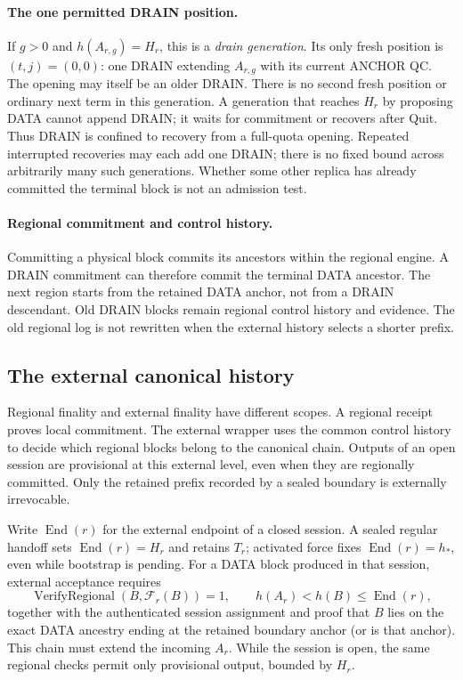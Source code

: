 \documentclass[11pt,a4paper]{article}
\newcommand{\FC}{\mathcal F}
\begin{document}
\paragraph{The one permitted DRAIN position.}
\label{sec:drain}
If $g>0$ and $h(A_{r,g})=H_r$, this is a \emph{drain generation}.
Its only fresh position is $(t,j)=(0,0)$: one DRAIN extending $A_{r,g}$
with its current ANCHOR QC. The opening may itself be an older DRAIN.
There is no second fresh position or ordinary next term in this generation.
A generation that reaches $H_r$ by proposing DATA cannot append DRAIN;
it waits for commitment or recovers after Quit. Thus DRAIN is confined
to recovery from a full-quota opening. Repeated interrupted recoveries may
each add one DRAIN; there is no fixed bound across arbitrarily many such
generations. Whether some other replica has already committed the terminal
block is not an admission test.

\paragraph{Regional commitment and control history.}
Committing a physical block commits its ancestors within the regional
engine. A DRAIN commitment can therefore commit the terminal DATA ancestor.
The next region starts from the retained DATA anchor, not from a DRAIN
descendant. Old DRAIN blocks remain regional control history and evidence.
The old regional log is not rewritten when the external history selects
a shorter prefix.

\subsection{The external canonical history}
\label{sec:external}
Regional finality and external finality have different scopes.
A regional receipt proves local commitment. The external wrapper uses
the common control history to decide which regional blocks belong to
the canonical chain. Outputs of an open session are provisional at this
external level, even when they are regionally committed.
Only the retained prefix recorded by a sealed boundary is externally
irrevocable.

Write $\operatorname{End}(r)$ for the external endpoint of a closed
session. A sealed regular handoff sets $\operatorname{End}(r)=H_r$ and
retains $T_r$; activated force fixes $\operatorname{End}(r)=h_*$, even
while bootstrap is pending. For a DATA block produced in that session,
external acceptance requires
\[
 \operatorname{VerifyRegional}(B,\FC_r(B))=1,\qquad
 h(A_r)<h(B)\le\operatorname{End}(r),
\]
together with the authenticated session assignment and proof that $B$
lies on the exact DATA ancestry ending at the retained boundary anchor
(or is that anchor). This chain must extend the incoming $A_r$.
While the session is open, the same regional
checks permit only provisional output, bounded by $H_r$.
\end{document}
